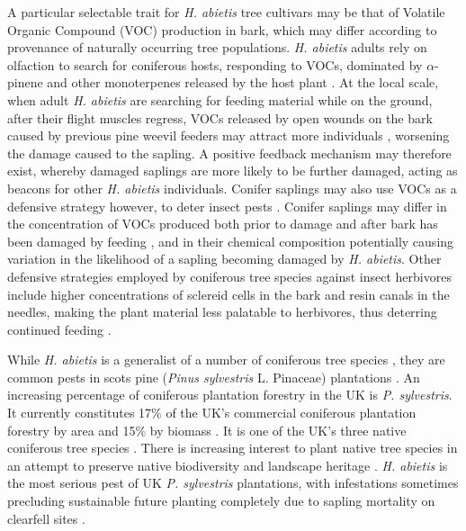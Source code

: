 \documentclass[a4paper, 11pt]{article}
\newcommand{\textapprox}{\raisebox{0.5ex}{\texttildelow}}
\begin{document}
A particular selectable trait for \textit{H. abietis} tree cultivars may be that of Volatile Organic Compound (VOC) production in bark, which may differ according to provenance of naturally occurring tree populations. \textit{H. abietis} adults rely on olfaction to search for coniferous hosts, responding to VOCs, dominated by $\alpha$-pinene and other monoterpenes released by the host plant \citep{Nordlander1986, Nordlander1987}. At the local scale, when adult \textit{H. abietis} are searching for feeding material while on the ground, after their flight muscles regress, VOCs released by open wounds on the bark caused by previous pine weevil feeders may attract more individuals \citep{Nordlander1987, Tilles1986}, worsening the damage caused to the sapling. A positive feedback mechanism may therefore exist, whereby damaged saplings are more likely to be further damaged, acting as beacons for other \textit{H. abietis} individuals. Conifer saplings may also use VOCs as a defensive strategy however, to deter insect pests \citep{Gershenzon1991, Trapp2001}. Conifer saplings may differ in the concentration of VOCs produced both prior to damage and after bark has been damaged by feeding \citep{Kivimaenpaa2012, Keeling2006}, and in their chemical composition \citep{Heijari2011} potentially causing variation in the likelihood of a sapling becoming damaged by \textit{H. abietis}. Other defensive strategies employed by coniferous tree species against insect herbivores include higher concentrations of sclereid cells in the bark and resin canals in the needles, making the plant material less palatable to herbivores, thus deterring continued feeding \citep{Donnelly2016, King2011}.

While \textit{H. abietis} is a generalist of a number of coniferous tree species \citep{Wallertz2014, Toivonen2006}, they are common pests in scots pine (\textit{Pinus sylvestris} L. Pinaceae) plantations \citep{Manlove1997}. An increasing percentage of coniferous plantation forestry in the UK is \textit{P. sylvestris}. It currently constitutes \textapprox{}17\% of the UK's commercial coniferous plantation forestry by area and \textapprox{}15\% by biomass \citep{ForestryStatistics2018}. It is one of the UK's three native coniferous tree species \citep{Cheffings2005}. There is increasing interest to plant native tree species in an attempt to preserve native biodiversity and landscape heritage \citep{HoC2016}. \textit{H. abietis} is the most serious pest of UK \textit{P. sylvestris} plantations, with infestations sometimes precluding sustainable future planting completely due to sapling mortality on clearfell sites \citep{Willoughby2017}.
\end{document}
